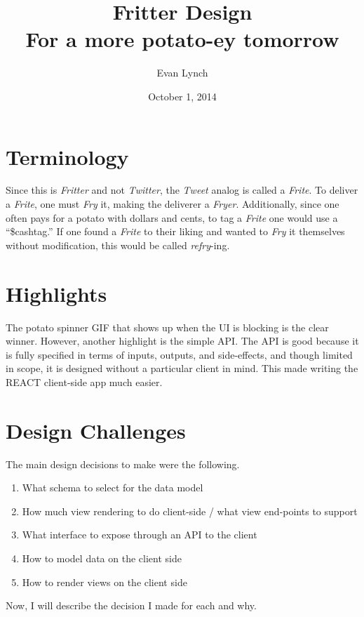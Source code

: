 \documentclass{amsart}
\title{Fritter Design \\ For a more potato-ey tomorrow}
\author{Evan Lynch}
\date{October 1, 2014}
\begin{document}
\maketitle
\section{Terminology}
Since this is \emph{Fritter} and not \emph{Twitter}, the \emph{Tweet} analog is
called a  \emph{Frite}. To deliver a \emph{Frite},
one must \emph{Fry} it, making the deliverer a \emph{Fryer}. Additionally, since one often
pays for a potato with dollars and cents, to tag a \emph{Frite} one would use a 
``\$cashtag.'' If one found a \emph{Frite} to their liking and wanted to \emph{Fry} it
themselves without modification, this would be called \emph{refry}-ing.

\section{Highlights}
\label{sec:subtitle}
The potato spinner GIF that shows up when the UI is blocking is the clear winner. However, another
highlight is the simple API. The API is good because it is fully specified in terms of inputs, outputs, and side-effects, and though limited in scope, it is designed without a particular client in mind. This made
writing the REACT client-side app much easier.

\section{Design Challenges}
\label{sec:another_subtitle}
The main design decisions to make were the following.
\begin{enumerate}
\item What schema to select for the data model
\item How much view rendering to do client-side / what view end-points to support
\item What interface to expose through an API to the client
\item How to model data on the client side
\item How to render views on the client side
\end{enumerate}
Now, I will describe the decision I made for each and why.
\end{document}
